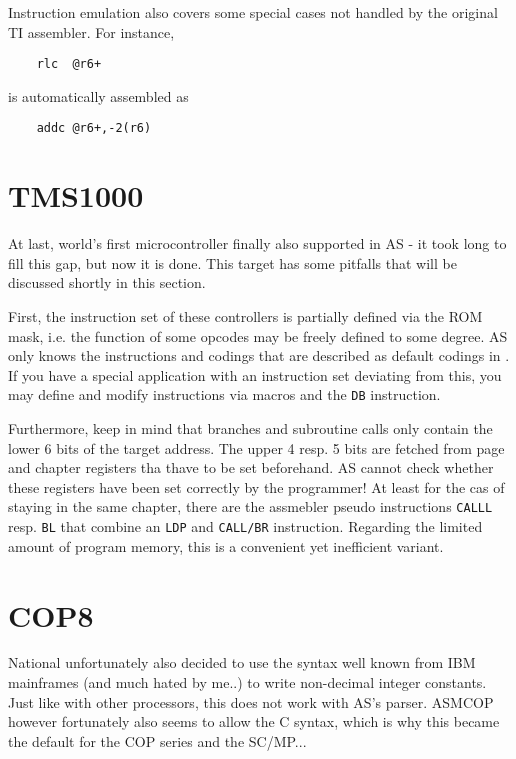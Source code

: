 \documentclass[12pt,twoside]{report}
\newcommand{\tty}[1]{{\tt #1}}
\newcommand{\asname}{{AS}}
\begin{document}
Instruction emulation also covers some special cases not handled
by the original TI assembler.  For instance,
\begin{verbatim}
    rlc  @r6+
\end{verbatim}
is automatically assembled as
\begin{verbatim}
    addc @r6+,-2(r6)
\end{verbatim}


\section{TMS1000}

At last, world's first microcontroller finally also supported in
\asname{} - it took long to fill this gap, but now it is done.  This
target has some pitfalls that will be discussed shortly in this
section.

First, the instruction set of these controllers is partially
defined via the ROM mask, i.e. the function of some opcodes may
be freely defined to some degree.  \asname{} only knows the instructions
and codings that are described as default codings in
\cite{TMS1000PGMRef}.  If you have a special application with an
instruction set deviating from this, you may define and modify
instructions via macros and the \tty{DB} instruction.

Furthermore, keep in mind that branches and subroutine calls only
contain the lower 6 bits of the target address.  The upper 4
resp. 5 bits are fetched from page and chapter registers tha
thave to be set beforehand.  \asname{} cannot check whether these
registers have been set correctly by the programmer! At least for
the cas of staying in the same chapter, there are the assmebler
pseudo instructions \tty{CALLL} resp. \tty{BL} that combine an
\tty{LDP} and \tty{CALL/BR} instruction.  Regarding the limited
amount of program memory, this is a convenient yet inefficient
variant.


\section{COP8}
\label{COP8Spec}

National unfortunately also decided to use the syntax well known from
IBM mainframes (and much hated by me..) to write non-decimal integer
constants.  Just like with other processors, this does not work with
\asname{}'s parser.  ASMCOP however fortunately also seems to allow the C
syntax, which is why this became the default for the COP series and
the SC/MP...
\end{document}
